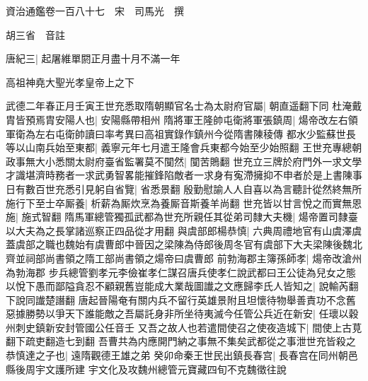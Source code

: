 資治通鑑卷一百八十七　宋　司馬光　撰

胡三省　音註

唐紀三|{
	起屠維單閼正月盡十月不滿一年}


高祖神堯大聖光孝皇帝上之下

武德二年春正月壬寅王世充悉取隋朝顯官名士為太尉府官屬|{
	朝直遥翻下同}
杜淹戴胄皆預焉胄安陽人也|{
	安陽縣帶相州}
隋將軍王隆帥屯衛將軍張鎮周|{
	煬帝改左右領軍衛為左右屯衛帥讀曰率考異曰高祖實錄作鎮州今從隋書陳稜傳}
都水少監蘇世長等以山南兵始至東都|{
	義寧元年七月遣王隆會兵東都今始至少始照翻}
王世充專總朝政事無大小悉關太尉府臺省監署莫不闃然|{
	闃苦鵙翻}
世充立三牌於府門外一求文學才識堪濟時務者一求武勇智畧能摧鋒陷敵者一求身有寃滯擁抑不申者於是上書陳事日有數百世充悉引見躬自省覽|{
	省悉景翻}
殷勤慰諭人人自喜以為言聽計從然終無所施行下至士卒厮養|{
	析薪為厮炊烹為養厮音斯養羊尚翻}
世充皆以甘言悅之而實無恩施|{
	施式智翻}
隋馬軍總管獨孤武都為世充所親任其從弟司隸大夫機|{
	煬帝置司隸臺以大夫為之長掌諸巡察正四品從才用翻}
與虞部郎楊恭慎|{
	六典周禮地官有山虞澤虞蓋虞部之職也魏始有虞曹郎中晉因之梁陳為侍郎後周冬官有虞部下大夫梁陳後魏北齊並祠部尚書領之隋工部尚書領之煬帝曰虞曹郎}
前勃海郡主簿孫師孝|{
	煬帝改滄州為勃海郡}
步兵總管劉孝元李儉崔孝仁謀召唐兵使孝仁說武都曰王公徒為兒女之態以悅下愚而鄙隘貪忍不顧親舊豈能成大業哉圖䜟之文應歸李氏人皆知之|{
	說輸芮翻下說同䜟楚譖翻}
唐起晉陽奄有關内兵不留行英雄景附且坦懷待物舉善責功不念舊惡據勝勢以爭天下誰能敵之吾屬託身非所坐待夷滅今任管公兵近在新安|{
	任瓌以穀州刺史鎮新安封管國公任音壬}
又吾之故人也若遣間使召之使夜造城下|{
	間使上古莧翻下疏吏翻造七到翻}
吾曹共為内應開門納之事無不集矣武都從之事泄世充皆殺之恭慎達之子也|{
	遠隋觀德王雄之弟}
癸卯命秦王世民出鎮長春宫|{
	長春宫在同州朝邑縣後周宇文護所建}
宇文化及攻魏州總管元寶藏四旬不克魏徵往說

